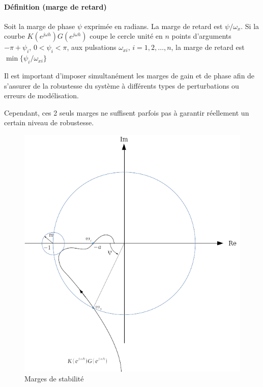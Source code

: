 \documentclass[11pt]{article}
\begin{document}
    \paragraph{Définition (marge de
retard)}\label{duxe9finition-marge-de-retard}

Soit la marge de phase \(\psi\) exprimée en radians. La marge de retard
est \(\psi/\omega_x\). Si la courbe \(K(e^{j\omega h})G(e^{j\omega h})\)
coupe le cercle unité en \(n\) points d'arguments
\(-\pi+\psi_i, \, 0 < \psi_i < \pi\), aux pulsations
\(\omega_{xi}, \, i = 1, 2, \dots, n\), la marge de retard est
\(\min\{\psi_i/\omega_{xi}\}\)

    Il est important d'imposer simultanément les marges de gain et de phase
afin de s'assurer de la robustesse du système à différents types de
perturbations ou erreurs de modélisation.

    Cependant, ces 2 seuls marges ne suffisent parfois pas à garantir
réellement un certain niveau de robustesse.

    \begin{figure}[htbp]
\centering
\includegraphics{Images/Chapter7/margins.png}
\caption{Marges de stabilité}
\end{figure}
\end{document}
